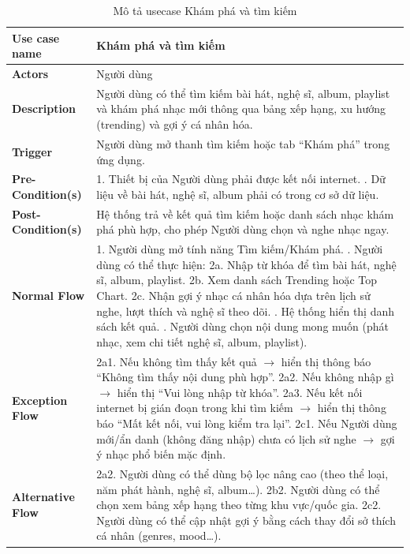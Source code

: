 \documentclass[a4paper]{article}
\newcommand{\cach}{\hspace*{1.5em}\ignorespaces}
\begin{document}
\begin{table}[h!]
\centering
\renewcommand{\arraystretch}{1.3} %
\begin{tabularx}{\textwidth}{|l|X|}
\hline
\textbf{Use case name} & Khám phá và tìm kiếm \\ \hline
\textbf{Actors}        & Người dùng \\ \hline
\textbf{Description}   & Người dùng có thể tìm kiếm bài hát, nghệ sĩ, album, playlist và khám phá nhạc mới thông qua bảng xếp hạng, xu hướng (trending) và gợi ý cá nhân hóa. \\ \hline
\textbf{Trigger}       & Người dùng mở thanh tìm kiếm hoặc tab “Khám phá” trong ứng dụng. \\ \hline
\textbf{Pre-Condition(s)} 
& 1. Thiết bị của Người dùng phải được kết nối internet. \newline
  2. Dữ liệu về bài hát, nghệ sĩ, album phải có trong cơ sở dữ liệu. \\ \hline
\textbf{Post-Condition(s)} 
& Hệ thống trả về kết quả tìm kiếm hoặc danh sách nhạc khám phá phù hợp, cho phép Người dùng chọn và nghe nhạc ngay. \\ \hline
\textbf{Normal Flow}   
& 1. Người dùng mở tính năng Tìm kiếm/Khám phá. \newline
  2. Người dùng có thể thực hiện: \newline
  \cach 2a. Nhập từ khóa để tìm bài hát, nghệ sĩ, album, playlist. \newline
  \cach 2b. Xem danh sách Trending hoặc Top Chart. \newline
  \cach 2c. Nhận gợi ý nhạc cá nhân hóa dựa trên lịch sử nghe, lượt thích và nghệ sĩ theo dõi. \newline
  3. Hệ thống hiển thị danh sách kết quả. \newline
  4. Người dùng chọn nội dung mong muốn (phát nhạc, xem chi tiết nghệ sĩ, album, playlist). \\ \hline
\textbf{Exception Flow} 
& 2a1. Nếu không tìm thấy kết quả $\rightarrow$ hiển thị thông báo “Không tìm thấy nội dung phù hợp”. \newline
  2a2. Nếu không nhập gì $\rightarrow$ hiển thị “Vui lòng nhập từ khóa”. \newline
  2a3. Nếu kết nối internet bị gián đoạn trong khi tìm kiếm $\rightarrow$ hiển thị thông báo “Mất kết nối, vui lòng kiểm tra lại”. \newline
  2c1. Nếu Người dùng mới/ẩn danh (không đăng nhập) chưa có lịch sử nghe $\rightarrow$ gợi ý nhạc phổ biến mặc định. \\ \hline
\textbf{Alternative Flow} 
& 2a2. Người dùng có thể dùng bộ lọc nâng cao (theo thể loại, năm phát hành, nghệ sĩ, album…). \newline
  2b2. Người dùng có thể chọn xem bảng xếp hạng theo từng khu vực/quốc gia. \newline
  2c2. Người dùng có thể cập nhật gợi ý bằng cách thay đổi sở thích cá nhân (genres, mood…). \\ \hline
\end{tabularx}
\caption{Mô tả usecase Khám phá và tìm kiếm}
\end{table}
\end{document}
